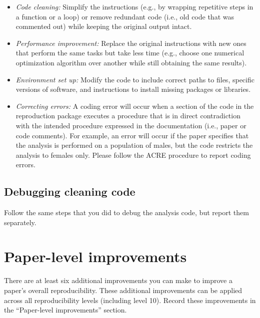 \documentclass[
]{book}
\providecommand{\tightlist}{%
  \setlength{\itemsep}{0pt}\setlength{\parskip}{0pt}}
\begin{document}
\begin{itemize}
\tightlist
\item
  \emph{Code cleaning:} Simplify the instructions (e.g., by wrapping repetitive steps in a function or a loop) or remove redundant code (i.e., old code that was commented out) while keeping the original output intact.\\
\item
  \emph{Performance improvement:} Replace the original instructions with new ones that perform the same tasks but take less time (e.g., choose one numerical optimization algorithm over another while still obtaining the same results).\\
\item
  \emph{Environment set up:} Modify the code to include correct paths to files, specific versions of software, and instructions to install missing packages or libraries.\\
\item
  \emph{Correcting errors:} A coding error will occur when a section of the code in the reproduction package executes a procedure that is in direct contradiction with the intended procedure expressed in the documentation (i.e., paper or code comments). For example, an error will occur if the paper specifies that the analysis is performed on a population of males, but the code restricts the analysis to females only. Please follow the ACRE procedure to report coding errors.
\end{itemize}

\hypertarget{debugging-cleaning-code}{%
\subsection{Debugging cleaning code}\label{debugging-cleaning-code}}

Follow the same steps that you did to debug the analysis code, but report them separately.

\hypertarget{paper-level}{%
\section{Paper-level improvements}\label{paper-level}}

There are at least six additional improvements you can make to improve a paper's overall reproducibility. These additional improvements can be applied across all reproducibility levels (including level 10). Record these improvements in the ``Paper-level improvements'' section.
\end{document}
